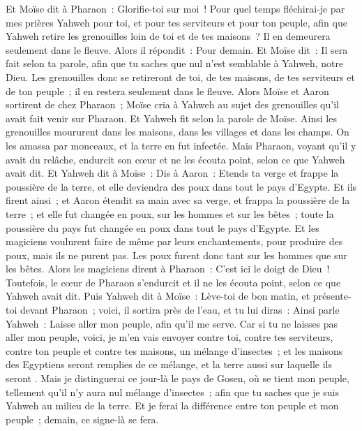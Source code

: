 \begin{multicols}{2}
Et Moïse dit à Pharaon~: Glorifie-toi sur moi~! Pour quel temps fléchirai-je par mes prières Yahweh pour toi, et pour tes serviteurs et pour ton peuple, afin que Yahweh retire les grenouilles loin de toi et de tes maisons~? Il en demeurera seulement dans le fleuve.
Alors il répondit~: Pour demain. Et Moïse dit~: Il sera fait selon ta parole, afin que tu saches que nul n'est semblable à Yahweh, notre Dieu.
Les grenouilles donc se retireront de toi, de tes maisons, de tes serviteurs et de ton peuple~; il en restera seulement dans le fleuve.
Alors Moïse et Aaron sortirent de chez Pharaon~; Moïse cria à Yahweh au sujet des grenouilles qu'il avait fait venir sur Pharaon.
Et Yahweh fit selon la parole de Moïse. Ainsi les grenouilles moururent dans les maisons, dans les villages et dans les champs.
On les amassa par monceaux, et la terre en fut infectée.
Mais Pharaon, voyant qu'il y avait du relâche, endurcit son cœur et ne les écouta point, selon ce que Yahweh avait dit.
Et Yahweh dit à Moïse~: Dis à Aaron~: Etends ta verge et frappe la poussière de la terre, et elle deviendra des poux dans tout le pays d'Egypte.
Et ils firent ainsi~; et Aaron étendit sa main avec sa verge, et frappa la poussière de la terre~; et elle fut changée en poux, sur les hommes et sur les bêtes~; toute la poussière du pays fut changée en poux dans tout le pays d'Egypte.
Et les magiciens voulurent faire de même par leurs enchantements, pour produire des poux, mais ils ne purent pas. Les poux furent donc tant sur les hommes que sur les bêtes.
Alors les magiciens dirent à Pharaon~: C'est ici le doigt de Dieu~! Toutefois, le cœur de Pharaon s'endurcit et il ne les écouta point, selon ce que Yahweh avait dit.
Puis Yahweh dit à Moïse~: Lève-toi de bon matin, et présente-toi devant Pharaon~; voici, il sortira près de l'eau, et tu lui diras~: Ainsi parle Yahweh~: Laisse aller mon peuple, afin qu'il me serve.
Car si tu ne laisses pas aller mon peuple, voici, je m'en vais envoyer contre toi, contre tes serviteurs, contre ton peuple et contre tes maisons, un mélange d'insectes~; et les maisons des Egyptiens seront remplies de ce mélange, et la terre aussi sur laquelle ils seront .
Mais je distinguerai ce jour-là le pays de Gosen, où se tient mon peuple, tellement qu'il n'y aura nul mélange d'insectes~; afin que tu saches que je suis Yahweh au milieu de la terre.
Et je ferai la différence entre ton peuple et mon peuple~; demain, ce signe-là se fera.

\end{multicols}
